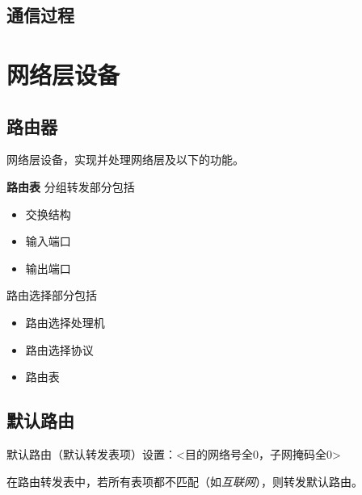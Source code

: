 \subsection{通信过程}


\section{网络层设备}

\subsection{路由器}
网络层设备，实现并处理网络层及以下的功能。

\textbf{路由表}
分组转发部分包括\begin{itemize}
    \item 交换结构
    \item 输入端口
    \item 输出端口
\end{itemize}

路由选择部分包括\begin{itemize}
    \item 路由选择处理机
    \item 路由选择协议
    \item 路由表
\end{itemize}

\subsection{默认路由}\label{默认路由}
默认路由（默认转发表项）设置：<目的网络号全0，子网掩码全0>

在路由转发表中，若所有表项都不匹配（如\textit{互联网}），则转发默认路由。


